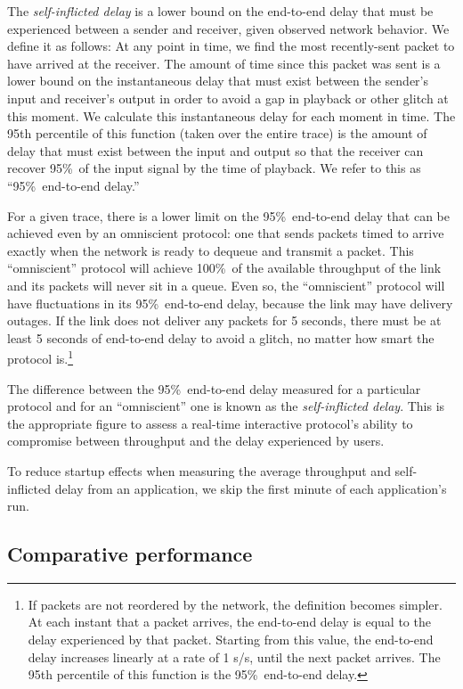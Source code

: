 The {\em self-inflicted delay} is a lower bound on the end-to-end
delay that must be experienced between a sender and receiver, given
observed network behavior. We define it as follows: At any point in
time, we find the most recently-sent packet to have arrived at the
receiver. The amount of time since this packet was sent is a lower
bound on the instantaneous delay that must exist between the sender's
input and receiver's output in order to avoid a gap in playback or
other glitch at this moment. We calculate this instantaneous delay for
each moment in time. The 95th percentile of this function (taken over the
entire trace) is the amount of delay that must exist between the input
and output so that the receiver can recover 95\%~of the input signal
by the time of playback. We refer to this as ``95\%~end-to-end
delay.''

For a given trace, there is a lower limit on the 95\%~end-to-end delay
that can be achieved even by an omniscient protocol: one that sends
packets timed to arrive exactly when the network is ready to dequeue
and transmit a packet. This ``omniscient'' protocol will achieve
100\%~of the available throughput of the link and its packets will
never sit in a queue. Even so, the ``omniscient'' protocol will have
fluctuations in its 95\%~end-to-end delay, because the link may have
delivery outages. If the link does not deliver any packets for 5
seconds, there must be at least 5 seconds of end-to-end delay to avoid
a glitch, no matter how smart the protocol is.\footnote{If packets are
  not reordered by the network, the definition becomes simpler. At
  each instant that a packet arrives, the end-to-end delay is equal to
  the delay experienced by that packet. Starting from this value, the
  end-to-end delay increases linearly at a rate of 1 s/s, until the
  next packet arrives. The 95th percentile of this function is the
  95\%~end-to-end delay.}

The difference between the 95\%~end-to-end delay measured for a
particular protocol and for an ``omniscient'' one is known as the
\emph{self-inflicted delay}. This is the appropriate figure to assess
a real-time interactive protocol's ability to compromise between
throughput and the delay experienced by users.

To reduce startup effects when measuring the average throughput and
self-inflicted delay from an application, we skip the first minute of
each application's run.

\subsection{Comparative performance}

